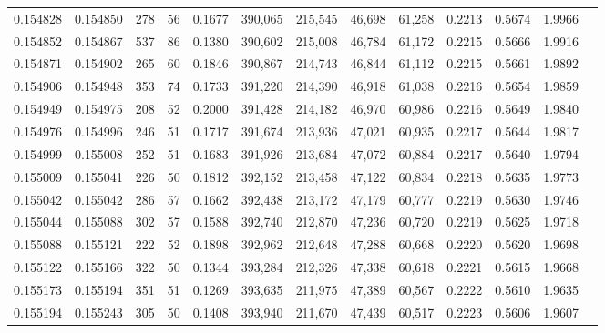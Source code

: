 \begin{tabular}{rrrrrrrrrrrrr}
0.154828 & 0.154850 &   278 &  56 &                                     0.1677 & 390,065 & 215,545 &  46,698 &  61,258 & 0.2213 & 0.5674 & 1.9966 \\
0.154852 & 0.154867 &   537 &  86 &                                     0.1380 & 390,602 & 215,008 &  46,784 &  61,172 & 0.2215 & 0.5666 & 1.9916 \\
0.154871 & 0.154902 &   265 &  60 &                                     0.1846 & 390,867 & 214,743 &  46,844 &  61,112 & 0.2215 & 0.5661 & 1.9892 \\
0.154906 & 0.154948 &   353 &  74 &                                     0.1733 & 391,220 & 214,390 &  46,918 &  61,038 & 0.2216 & 0.5654 & 1.9859 \\
0.154949 & 0.154975 &   208 &  52 &                                     0.2000 & 391,428 & 214,182 &  46,970 &  60,986 & 0.2216 & 0.5649 & 1.9840 \\
0.154976 & 0.154996 &   246 &  51 &                                     0.1717 & 391,674 & 213,936 &  47,021 &  60,935 & 0.2217 & 0.5644 & 1.9817 \\
0.154999 & 0.155008 &   252 &  51 &                                     0.1683 & 391,926 & 213,684 &  47,072 &  60,884 & 0.2217 & 0.5640 & 1.9794 \\
0.155009 & 0.155041 &   226 &  50 &                                     0.1812 & 392,152 & 213,458 &  47,122 &  60,834 & 0.2218 & 0.5635 & 1.9773 \\
0.155042 & 0.155042 &   286 &  57 &                                     0.1662 & 392,438 & 213,172 &  47,179 &  60,777 & 0.2219 & 0.5630 & 1.9746 \\
0.155044 & 0.155088 &   302 &  57 &                                     0.1588 & 392,740 & 212,870 &  47,236 &  60,720 & 0.2219 & 0.5625 & 1.9718 \\
0.155088 & 0.155121 &   222 &  52 &                                     0.1898 & 392,962 & 212,648 &  47,288 &  60,668 & 0.2220 & 0.5620 & 1.9698 \\
0.155122 & 0.155166 &   322 &  50 &                                     0.1344 & 393,284 & 212,326 &  47,338 &  60,618 & 0.2221 & 0.5615 & 1.9668 \\
0.155173 & 0.155194 &   351 &  51 &                                     0.1269 & 393,635 & 211,975 &  47,389 &  60,567 & 0.2222 & 0.5610 & 1.9635 \\
0.155194 & 0.155243 &   305 &  50 &                                     0.1408 & 393,940 & 211,670 &  47,439 &  60,517 & 0.2223 & 0.5606 & 1.9607 \\

\end{tabular}
